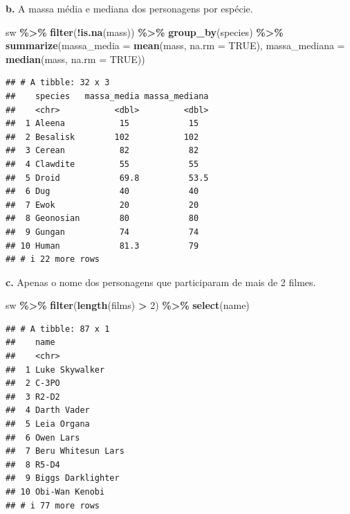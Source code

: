 \documentclass[
]{book}
\newenvironment{Shaded}{\begin{snugshade}}{\end{snugshade}}
\newcommand{\AttributeTok}[1]{\textcolor[rgb]{0.13,0.29,0.53}{#1}}
\newcommand{\ConstantTok}[1]{\textcolor[rgb]{0.56,0.35,0.01}{#1}}
\newcommand{\DecValTok}[1]{\textcolor[rgb]{0.00,0.00,0.81}{#1}}
\newcommand{\FunctionTok}[1]{\textcolor[rgb]{0.13,0.29,0.53}{\textbf{#1}}}
\newcommand{\NormalTok}[1]{#1}
\newcommand{\SpecialCharTok}[1]{\textcolor[rgb]{0.81,0.36,0.00}{\textbf{#1}}}
\begin{document}
\textbf{b.} A massa média e mediana dos personagens por espécie.

\begin{Shaded}
\begin{Highlighting}[]
\NormalTok{sw }\SpecialCharTok{\%\textgreater{}\%}
  \FunctionTok{filter}\NormalTok{(}\SpecialCharTok{!}\FunctionTok{is.na}\NormalTok{(mass)) }\SpecialCharTok{\%\textgreater{}\%} 
  \FunctionTok{group\_by}\NormalTok{(species) }\SpecialCharTok{\%\textgreater{}\%} 
  \FunctionTok{summarize}\NormalTok{(}\AttributeTok{massa\_media =} \FunctionTok{mean}\NormalTok{(mass, }\AttributeTok{na.rm =} \ConstantTok{TRUE}\NormalTok{),}
            \AttributeTok{massa\_mediana =} \FunctionTok{median}\NormalTok{(mass, }\AttributeTok{na.rm =} \ConstantTok{TRUE}\NormalTok{))}
\end{Highlighting}
\end{Shaded}

\begin{verbatim}
## # A tibble: 32 x 3
##    species   massa_media massa_mediana
##    <chr>           <dbl>         <dbl>
##  1 Aleena           15            15  
##  2 Besalisk        102           102  
##  3 Cerean           82            82  
##  4 Clawdite         55            55  
##  5 Droid            69.8          53.5
##  6 Dug              40            40  
##  7 Ewok             20            20  
##  8 Geonosian        80            80  
##  9 Gungan           74            74  
## 10 Human            81.3          79  
## # i 22 more rows
\end{verbatim}

\textbf{c.} Apenas o nome dos personagens que participaram de mais de 2
filmes.

\begin{Shaded}
\begin{Highlighting}[]
\NormalTok{sw }\SpecialCharTok{\%\textgreater{}\%} 
  \FunctionTok{filter}\NormalTok{(}\FunctionTok{length}\NormalTok{(films) }\SpecialCharTok{\textgreater{}} \DecValTok{2}\NormalTok{) }\SpecialCharTok{\%\textgreater{}\%} 
  \FunctionTok{select}\NormalTok{(name)}
\end{Highlighting}
\end{Shaded}

\begin{verbatim}
## # A tibble: 87 x 1
##    name              
##    <chr>             
##  1 Luke Skywalker    
##  2 C-3PO             
##  3 R2-D2             
##  4 Darth Vader       
##  5 Leia Organa       
##  6 Owen Lars         
##  7 Beru Whitesun Lars
##  8 R5-D4             
##  9 Biggs Darklighter 
## 10 Obi-Wan Kenobi    
## # i 77 more rows
\end{verbatim}

  
\end{document}
